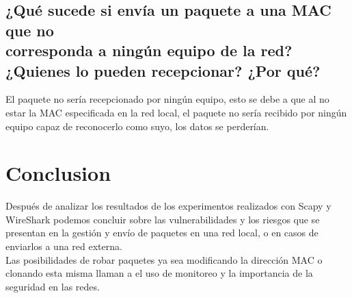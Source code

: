 \documentclass{udpreport}
\begin{document}
\section{¿Qué sucede si envía un paquete a una MAC que no\\ corresponda a ningún equipo
de la red? ¿Quienes lo pueden recepcionar? ¿Por qué?}
El paquete no sería recepcionado por ningún equipo, esto se debe a que al no estar la MAC especificada en la red local, el paquete no sería recibido por ningún equipo capaz de reconocerlo como suyo, los datos se perderían.

\chapter{Conclusion}
Después de analizar los resultados de los experimentos realizados con Scapy y WireShark podemos concluir sobre las vulnerabilidades y los riesgos que se presentan en la gestión y envío de paquetes en una red local, o en casos de enviarlos a una red externa.\\
Las posibilidades de robar paquetes ya sea modificando la dirección MAC o clonando esta misma llaman a el uso de monitoreo y la importancia de la seguridad en las redes.
\end{document}
